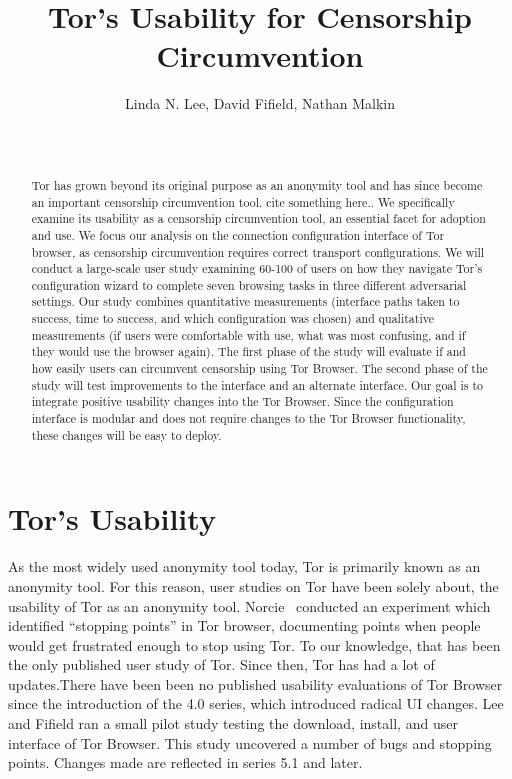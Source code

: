 \documentclass{template}
\begin{document}
\title{Tor's Usability for Censorship Circumvention}
\author{
 \alignauthor Linda N. Lee, David Fifield, Nathan Malkin \\
   \vspace{0.5em}
    \\
   \\
}
\maketitle

\begin{abstract}
Tor has grown beyond its original purpose as an anonymity tool and has 
since become an important censorship circumvention tool. {\color {red} cite something here..}
We specifically examine its usability as a censorship circumvention tool,
an essential facet for adoption and use.  
We focus our analysis on the connection configuration interface of Tor browser,
as censorship circumvention requires correct transport configurations.
We will conduct a large-scale user study examining 60-100 of users 
on how they navigate Tor's configuration wizard to complete seven browsing tasks 
in three different adversarial settings. Our study combines quantitative measurements (interface
paths taken to success, time to success, and which configuration was chosen) and
qualitative measurements (if users were comfortable with use, what was most confusing, and 
if they would use the browser again). The first phase of the study will evaluate if and how 
easily users can circumvent censorship using Tor Browser. The second phase
of the study will test improvements to the interface and an alternate interface. 
Our goal is to integrate positive usability changes into the Tor Browser. Since
the configuration interface is modular and does not require changes to the Tor Browser
functionality, these changes will be easy to deploy. 

\end{abstract}


\section{Tor's Usability}
As the most widely used anonymity tool today, Tor is primarily known as an anonymity tool. 
For this reason, user studies on Tor have been solely about, the usability of Tor as an 
anonymity tool. Norcie~\cite{norcie2012eliminating} conducted an experiment which identified 
``stopping points'' in Tor browser,  documenting points when people would get frustrated enough 
to stop using Tor. To our knowledge, that has been the only published user study of Tor. 
Since then, Tor has had a lot of updates.There have been been no published usability evaluations of
Tor Browser since the introduction of the 4.0 series, which introduced radical UI changes. 
Lee and Fifield \cite {uxsprint} ran a small pilot study testing the download, install, and user interface of Tor Browser. 
This study uncovered a number of bugs and stopping points. Changes made are reflected in series 
5.1 and later. 
\end{document}
